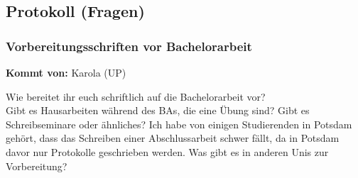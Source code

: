   \subsection*{Protokoll (Fragen)}
    \subsubsection*{Vorbereitungsschriften vor Bachelorarbeit}
      \textbf{Kommt von:} Karola (UP)

      Wie bereitet ihr euch schriftlich auf die Bachelorarbeit vor? \\

      Gibt es Hausarbeiten während des BAs, die eine Übung sind?
      Gibt es Schreibseminare oder ähnliches?
      Ich habe von einigen Studierenden in Potsdam gehört, dass das Schreiben einer Abschlussarbeit schwer fällt, da in Potsdam davor nur Protokolle geschrieben werden. Was gibt es in anderen Unis zur Vorbereitung?

